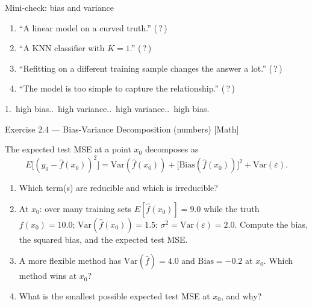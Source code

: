 \documentclass[aspectratio=169,11pt]{beamer}
\begin{document}
\begin{frame}{Mini-check: bias and variance}
  \begin{readme}
    \begin{enumerate}
      \item ``A linear model on a curved truth.'' \hfill (\,?\,)
      \item ``A KNN classifier with $K = 1$.''      \hfill (\,?\,)
      \item ``Refitting on a different training sample changes the
            answer a lot.'' \hfill (\,?\,)
      \item ``The model is too simple to capture the relationship.''
            \hfill (\,?\,)
    \end{enumerate}
  \end{readme}
  \begin{takeaway}[Answers]
    1.\ high bias..\ high variance..\ high variance..\ high bias.
  \end{takeaway}
\end{frame}

\begin{frame}{Exercise 2.4 --- Bias-Variance Decomposition (numbers) [Math]}
\begin{exercise}
The expected test MSE at a point $x_0$ decomposes as
\[
  E\bigl[(y_0-\hat f(x_0))^2\bigr]
   = \mathrm{Var}(\hat f(x_0)) + \bigl[\mathrm{Bias}(\hat f(x_0))\bigr]^2
   + \mathrm{Var}(\varepsilon).
\]
\begin{enumerate}
  \item Which term(s) are reducible and which is irreducible?
  \item At $x_0$: over many training sets $E[\hat f(x_0)]=9.0$ while
        the truth $f(x_0)=10.0$; $\mathrm{Var}(\hat f(x_0))=1.5$;
        $\sigma^2=\mathrm{Var}(\varepsilon)=2.0$. Compute the bias,
        the squared bias, and the expected test MSE.
  \item A more flexible method has $\mathrm{Var}(\hat f)=4.0$ and
        $\mathrm{Bias}=-0.2$ at $x_0$. Which method wins at $x_0$?
  \item What is the smallest possible expected test MSE at $x_0$, and
        why?
\end{enumerate}
\end{exercise}
\end{frame}
\end{document}
